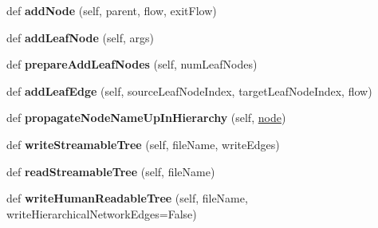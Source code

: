 \begin{DoxyCompactItemize}
def {\bfseries add\+Node} (self, parent, flow, exit\+Flow)
\item 
\mbox{\label{classdsmacc_1_1graph_1_1infomap_1_1HierarchicalNetwork_ad463bdfc5cb881a355d02457a4e61566}} 
def {\bfseries add\+Leaf\+Node} (self, args)
\item 
\mbox{\label{classdsmacc_1_1graph_1_1infomap_1_1HierarchicalNetwork_a9470cb0ac653d49539326506b6061815}} 
def {\bfseries prepare\+Add\+Leaf\+Nodes} (self, num\+Leaf\+Nodes)
\item 
\mbox{\label{classdsmacc_1_1graph_1_1infomap_1_1HierarchicalNetwork_a13df381ef1746f77f8b8dae66feb2862}} 
def {\bfseries add\+Leaf\+Edge} (self, source\+Leaf\+Node\+Index, target\+Leaf\+Node\+Index, flow)
\item 
\mbox{\label{classdsmacc_1_1graph_1_1infomap_1_1HierarchicalNetwork_a9f94df696da51a5e36f0d2fcb7301688}} 
def {\bfseries propagate\+Node\+Name\+Up\+In\+Hierarchy} (self, \mbox{\hyperlink{structnode}{node}})
\item 
\mbox{\label{classdsmacc_1_1graph_1_1infomap_1_1HierarchicalNetwork_ace7c9d30dc5d3a71f834f81611d49a3e}} 
def {\bfseries write\+Streamable\+Tree} (self, file\+Name, write\+Edges)
\item 
\mbox{\label{classdsmacc_1_1graph_1_1infomap_1_1HierarchicalNetwork_a60afb929ebd19ab39b27570fd09361c1}} 
def {\bfseries read\+Streamable\+Tree} (self, file\+Name)
\item 
\mbox{\label{classdsmacc_1_1graph_1_1infomap_1_1HierarchicalNetwork_a943fee0a3950dd77e87aa9ebf7b51e86}} 
def {\bfseries write\+Human\+Readable\+Tree} (self, file\+Name, write\+Hierarchical\+Network\+Edges=False)
\item 
\mbox{\label{classdsmacc_1_1graph_1_1infomap_1_1HierarchicalNetwork_acc70280f03d8a557190bdc044c6eeb84}} 

\end{DoxyCompactItemize}
